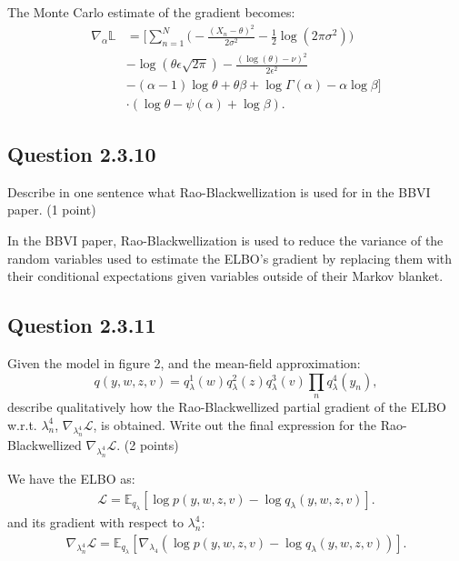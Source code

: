 \documentclass{article}
\begin{document}
\begin{multicols}{2}
    The Monte Carlo estimate of the gradient becomes:
    \begin{align*}
        \widehat{\nabla_\alpha \mathbb{L}} &= \Bigg[\sum_{n=1}^N \Big(-\frac{(X_n - \theta)^2}{2\sigma^2} - \frac{1}{2} \log(2\pi\sigma^2)\Big) \\&
        - \log(\theta \epsilon \sqrt{2\pi}) - \frac{(\log(\theta) - \nu)^2}{2\epsilon^2} \\
        &- (\alpha - 1)\log \theta + \theta \beta + \log \Gamma(\alpha) - \alpha \log \beta \Bigg]\\& \cdot (\log \theta - \psi(\alpha) + \log \beta).
    \end{align*}

    \subsection*{Question 2.3.10}
    Describe in one sentence what Rao-Blackwellization is used for in the BBVI paper. (1 point)\bigskip 

    In the BBVI paper, Rao-Blackwellization is used to reduce the variance of the random variables used to estimate the ELBO's gradient by replacing them with their conditional expectations given variables outside of their Markov blanket.


    \subsection*{Question 2.3.11}
    Given the model in figure 2, and the mean-field approximation:  
    \[
    q(y, w, z, v) = q_\lambda^1(w)q_\lambda^2(z)q_\lambda^3(v)\prod_n q_\lambda^4(y_n),
    \]
    describe qualitatively how the Rao-Blackwellized partial gradient of the ELBO w.r.t. \(\lambda_n^4\), \(\nabla_{\lambda_n^4} \mathcal{L}\), is obtained. Write out the final expression for the Rao-Blackwellized \(\nabla_{\lambda_n^4} \mathcal{L}\). (2 points)\bigskip

    We have the ELBO as:
    \begin{align*}
        \mathcal{L} = \mathbb{E}_{q_\lambda}\left[\log p(y, w, z, v) - \log q_\lambda(y, w, z, v)\right].
    \end{align*}
    and its gradient with respect to \(\lambda_n^4\):
    \begin{align*}
        \nabla_{\lambda_n^4}\mathcal{L} = \mathbb{E}_{q_\lambda}\left[\nabla_{\lambda_4}(\log p(y, w, z, v) - \log q_\lambda(y, w, z, v))\right].
    \end{align*}


\end{multicols}
\end{document}
